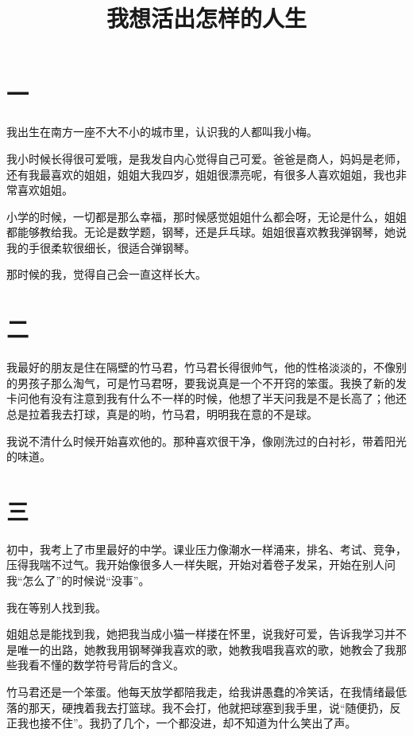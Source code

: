 \documentclass[12pt, a4paper]{ctexart}
\title{\textbf{我想活出怎样的人生}}
\author{}
\date{}
\begin{document}
\maketitle
\thispagestyle{empty}

\section*{一}

我出生在南方一座不大不小的城市里，认识我的人都叫我小梅。

我小时候长得很可爱哦，是我发自内心觉得自己可爱。爸爸是商人，妈妈是老师，还有我最喜欢的姐姐，姐姐大我四岁，姐姐很漂亮呢，有很多人喜欢姐姐，我也非常喜欢姐姐。

小学的时候，一切都是那么幸福，那时候感觉姐姐什么都会呀，无论是什么，姐姐都能够教给我。无论是数学题，钢琴，还是乒乓球。姐姐很喜欢教我弹钢琴，她说我的手很柔软很细长，很适合弹钢琴。

那时候的我，觉得自己会一直这样长大。

\section*{二}

我最好的朋友是住在隔壁的竹马君，竹马君长得很帅气，他的性格淡淡的，不像别的男孩子那么淘气，可是竹马君呀，要我说真是一个不开窍的笨蛋。我换了新的发卡问他有没有注意到我有什么不一样的时候，他想了半天问我是不是长高了；他还总是拉着我去打球，真是的哟，竹马君，明明我在意的不是球。

我说不清什么时候开始喜欢他的。那种喜欢很干净，像刚洗过的白衬衫，带着阳光的味道。

\section*{三}

初中，我考上了市里最好的中学。课业压力像潮水一样涌来，排名、考试、竞争，压得我喘不过气。我开始像很多人一样失眠，开始对着卷子发呆，开始在别人问我“怎么了”的时候说“没事”。

我在等别人找到我。

姐姐总是能找到我，她把我当成小猫一样搂在怀里，说我好可爱，告诉我学习并不是唯一的出路，她教我用钢琴弹我喜欢的歌，她教我唱我喜欢的歌，她教会了我那些我看不懂的数学符号背后的含义。

竹马君还是一个笨蛋。他每天放学都陪我走，给我讲愚蠢的冷笑话，在我情绪最低落的那天，硬拽着我去打篮球。我不会打，他就把球塞到我手里，说“随便扔，反正我也接不住”。我扔了几个，一个都没进，却不知道为什么笑出了声。
\end{document}

